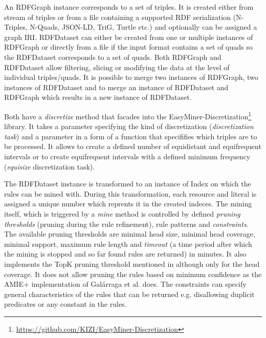 
An RDFGraph instance corresponds to a set of triples. It is created either from stream of triples or from a file containing a supported RDF serialization (N-Triples, N-Quads, JSON-LD, TriG, Turtle etc.) and optionally can be assigned a graph IRI. RDFDataset can either be created from one or multiple instances of RDFGraph or directly from a file if the input format contains a set of quads so the RDFDataset corresponds to a set of quads. Both RDFGraph and RDFDataset allow filtering, slicing or modifying the data at the level of individual triples/quads. It is possible to merge two instances of RDFGraph, two instances of RDFDataset and to merge an instance of RDFDataset and RDFGraph which results in a new instance of RDFDataset.

Both have a \textit{discretize} method that facades into the EasyMiner-Discretization\footnote{\href{https://github.com/KIZI/EasyMiner-Discretization}{https://github.com/KIZI/EasyMiner-Discretization}} library. It takes a parameter specifying the kind of discretization (\textit{discretization task}) and a parameter in a form of a function that specififies which triples are to be processed. It allows to create a defined number of equidistant and equifrequent intervals or to create equifrequent intervals with a defined minimum frequency (\textit{equisize} discretization task).


The RDFDataset instance is transformed to an instance of Index on which the rules can be mined with. During this transformation, each resource and literal is assigned a unique number which reprents it in the created indeces. The mining itself, which is triggered by a \textit{mine} method is controlled by defined \textit{pruning thresholds} (pruning during the rule refinement), rule patterns and \textit{constraints}. The available pruning thresholds are minimal head size, minimal head coverage, minimal support, maximum rule length and \textit{timeout} (a time period after which the mining is stopped and so far found rules are returned) in minutes. It also implements the TopK pruning threshold mentioned in \cite{Zeman2020} although only for the head coverage. It does not allow pruning the rules based on minimum confidence as the AMIE+ implementation of Galárraga et al. does. The constraints can specify general characteristics of the rules that can be returned e.g. disallowing duplicit predicates or any constant in the rules.

